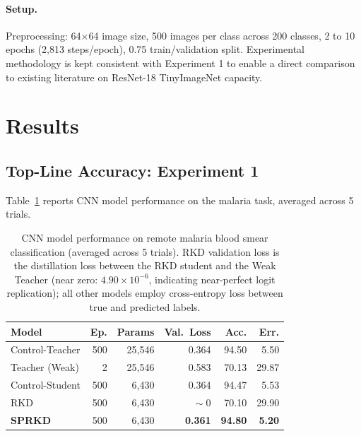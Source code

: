 \documentclass[letterpaper]{article}
\begin{document}
\paragraph{Setup.}
Preprocessing: 64$\times$64 image size, 500 images per class across 200 classes, 2 to 10 epochs (2{,}813 steps/epoch), 0.75 train/validation split. Experimental methodology is kept consistent with Experiment 1 to enable a direct comparison to existing literature on ResNet-18 TinyImageNet capacity.

\section{Results}

\subsection{Top-Line Accuracy: Experiment 1}

Table~\ref{tab:malaria} reports CNN model performance on the malaria task, averaged across 5 trials.

\begin{table}[t]
\centering
\small
\setlength{\tabcolsep}{3pt}
\begin{tabular}{lrrrrr}
\toprule
\textbf{Model} & \textbf{Ep.} & \textbf{Params} & \textbf{Val.~Loss} & \textbf{Acc.} & \textbf{Err.} \\
\midrule
Control-Teacher & 500 & 25{,}546 & 0.364 & 94.50 & 5.50 \\
Teacher (Weak)  & 2   & 25{,}546 & 0.583 & 70.13 & 29.87 \\
Control-Student & 500 & 6{,}430  & 0.364 & 94.47 & 5.53 \\
RKD             & 500 & 6{,}430  & $\!\sim\!0$ & 70.10 & 29.90 \\
\textbf{SPRKD}  & 500 & 6{,}430  & \textbf{0.361} & \textbf{94.80} & \textbf{5.20} \\
\bottomrule
\end{tabular}
\caption{CNN model performance on remote malaria blood smear classification (averaged across 5 trials). RKD validation loss is the distillation loss between the RKD student and the Weak Teacher (near zero: $4.90\!\times\!10^{-6}$, indicating near-perfect logit replication); all other models employ cross-entropy loss between true and predicted labels.}
\label{tab:malaria}
\end{table}
\end{document}
